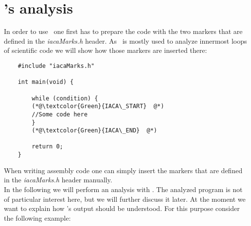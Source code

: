 \section{\iaca's analysis} 

In order to use \iaca\ one first has to prepare the code with the two markers that are defined in the \emph{iacaMarks.h} header. As \iaca\ is mostly used to analyze innermost loops of scientific code we will show how those markers are inserted there:

\begin{mdframed}[backgroundcolor=light-gray, roundcorner=10pt,leftmargin=1, rightmargin=1, innerleftmargin=15, innertopmargin=1,innerbottommargin=1, outerlinewidth=1, linecolor=light-gray]
    \begin{lstlisting}
    #include "iacaMarks.h"
    
    int main(void) {
    
        while (condition) {
        (*@\textcolor{Green}{IACA\_START}  @*)
        //Some code here
        }
        (*@\textcolor{Green}{IACA\_END}  @*)
    
        return 0;
    }
    \end{lstlisting}
\end{mdframed}

When writing assembly code one can simply insert the markers that are defined in the \emph{iacaMarks.h} header manually.\\
In the following we will perform an analysis with \iaca. The analyzed program is not of particular interest here, but we will further discuss it later. At the moment we want to explain how \iaca's output should be understood. For this purpose consider the following example:

